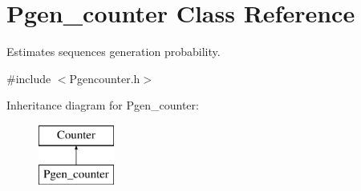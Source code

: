 \hypertarget{classPgen__counter}{}\section{Pgen\+\_\+counter Class Reference}
\label{classPgen__counter}


Estimates sequences generation probability.  




{\ttfamily \#include $<$Pgencounter.\+h$>$}

Inheritance diagram for Pgen\+\_\+counter\+:\begin{figure}[H]
\begin{center}
\leavevmode
\includegraphics[height=2.000000cm]{d4/d57/classPgen__counter}
\end{center}
\end{figure}
